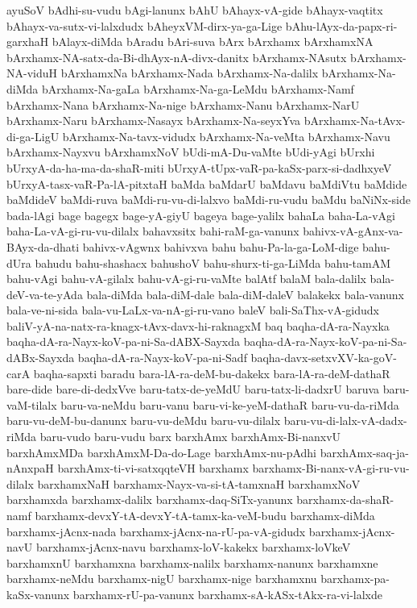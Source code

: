 {ayuSoV
bAdhi-su-vudu
bAgi-lanunx
bAhU
bAhayx-vA-gide
bAhayx-vaqtitx
bAhayx-va-sutx-vi-lalxdudx
bAheyxVM-dirx-ya-ga-Lige
bAhu-lAyx-da-papx-ri-garxhaH
bAlayx-diMda
bAradu
bAri-suva
bArx
bArxhamx
bArxhamxNA
bArxhamx-NA-satx-da-Bi-dhAyx-nA-divx-danitx
bArxhamx-NAsutx
bArxhamx-NA-viduH
bArxhamxNa
bArxhamx-Nada
bArxhamx-Na-dalilx
bArxhamx-Na-diMda
bArxhamx-Na-gaLa
bArxhamx-Na-ga-LeMdu
bArxhamx-Namf
bArxhamx-Nana
bArxhamx-Na-nige
bArxhamx-Nanu
bArxhamx-NarU
bArxhamx-Naru
bArxhamx-Nasayx
bArxhamx-Na-seyxYva
bArxhamx-Na-tAvx-di-ga-LigU
bArxhamx-Na-tavx-vidudx
bArxhamx-Na-veMta
bArxhamx-Navu
bArxhamx-Nayxvu
bArxhamxNoV
bUdi-mA-Du-vaMte
bUdi-yAgi
bUrxhi
bUrxyA-da-ha-ma-da-shaR-miti
bUrxyA-tUpx-vaR-pa-kaSx-parx-si-dadhxyeV
bUrxyA-tasx-vaR-Pa-lA-pitxtaH
baMda
baMdarU
baMdavu
baMdiVtu
baMdide
baMdideV
baMdi-ruva
baMdi-ru-vu-di-lalxvo
baMdi-ru-vudu
baMdu
baNiNx-side
bada-lAgi
bage
bagegx
bage-yA-giyU
bageya
bage-yalilx
bahaLa
baha-La-vAgi
baha-La-vA-gi-ru-vu-dilalx
bahavxsitx
bahi-raM-ga-vanunx
bahivx-vA-gAnx-va-BAyx-da-dhati
bahivx-vAgwnx
bahivxva
bahu
bahu-Pa-la-ga-LoM-dige
bahu-dUra
bahudu
bahu-shashacx
bahushoV
bahu-shurx-ti-ga-LiMda
bahu-tamAM
bahu-vAgi
bahu-vA-gilalx
bahu-vA-gi-ru-vaMte
balAtf
balaM
bala-dalilx
bala-deV-va-te-yAda
bala-diMda
bala-diM-dale
bala-diM-daleV
balakekx
bala-vanunx
bala-ve-ni-sida
bala-vu-LaLx-va-nA-gi-ru-vano
baleV
bali-SaThx-vA-gidudx
baliV-yA-na-natx-ra-knagx-tAvx-davx-hi-raknagxM
baq
baqha-dA-ra-Nayxka
baqha-dA-ra-Nayx-koV-pa-ni-Sa-dABX-Sayxda
baqha-dA-ra-Nayx-koV-pa-ni-Sa-dABx-Sayxda
baqha-dA-ra-Nayx-koV-pa-ni-Sadf
baqha-davx-setxvXV-ka-goV-carA
baqha-sapxti
baradu
bara-lA-ra-deM-bu-dakekx
bara-lA-ra-deM-dathaR
bare-dide
bare-di-dedxVve
baru-tatx-de-yeMdU
baru-tatx-li-dadxrU
baruva
baru-vaM-tilalx
baru-va-neMdu
baru-vanu
baru-vi-ke-yeM-dathaR
baru-vu-da-riMda
baru-vu-deM-bu-danunx
baru-vu-deMdu
baru-vu-dilalx
baru-vu-di-lalx-vA-dadx-riMda
baru-vudo
baru-vudu
barx
barxhAmx
barxhAmx-Bi-nanxvU
barxhAmxMDa
barxhAmxM-Da-do-Lage
barxhAmx-nu-pAdhi
barxhAmx-saq-ja-nAnxpaH
barxhAmx-ti-vi-satxqqteVH
barxhamx
barxhamx-Bi-nanx-vA-gi-ru-vu-dilalx
barxhamxNaH
barxhamx-Nayx-va-si-tA-tamxnaH
barxhamxNoV
barxhamxda
barxhamx-dalilx
barxhamx-daq-SiTx-yanunx
barxhamx-da-shaR-namf
barxhamx-devxY-tA-devxY-tA-tamx-ka-veM-budu
barxhamx-diMda
barxhamx-jAcnx-nada
barxhamx-jAcnx-na-rU-pa-vA-gidudx
barxhamx-jAcnx-navU
barxhamx-jAcnx-navu
barxhamx-loV-kakekx
barxhamx-loVkeV
barxhamxnU
barxhamxna
barxhamx-nalilx
barxhamx-nanunx
barxhamxne
barxhamx-neMdu
barxhamx-nigU
barxhamx-nige
barxhamxnu
barxhamx-pa-kaSx-vanunx
barxhamx-rU-pa-vanunx
barxhamx-sA-kASx-tAkx-ra-vi-lalxde
}
